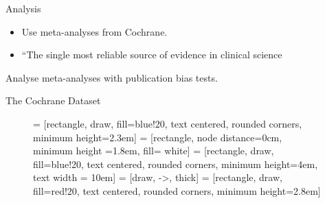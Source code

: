 \documentclass[english]{beamer}\usepackage[]{graphicx}\usepackage[]{color}
\begin{document}
\begin{frame}{Analysis}
\begin{itemize}
\item Use meta-analyses from Cochrane.
\item ``The single most reliable source of evidence in clinical science
\end{itemize}

Analyse meta-analyses with publication bias tests.
\end{frame}

\begin{frame}{The Cochrane Dataset}
\small
\begin{figure}
\begin{center}
 = [rectangle, draw, fill=blue!20, text centered, rounded corners, minimum height=2.3em]
 = [rectangle, node distance=0cm, minimum height =1.8em, fill= white]
 = [rectangle, draw, fill=blue!20, text centered, rounded corners, minimum height=4em, text width = 10em]
 = [draw, ->, thick]
 = [rectangle, draw, fill=red!20, text centered, rounded corners, minimum height=2.8em]

\label{Inclusion.criteria}
\end{center}
\end{figure}
\end{frame}
\end{document}
